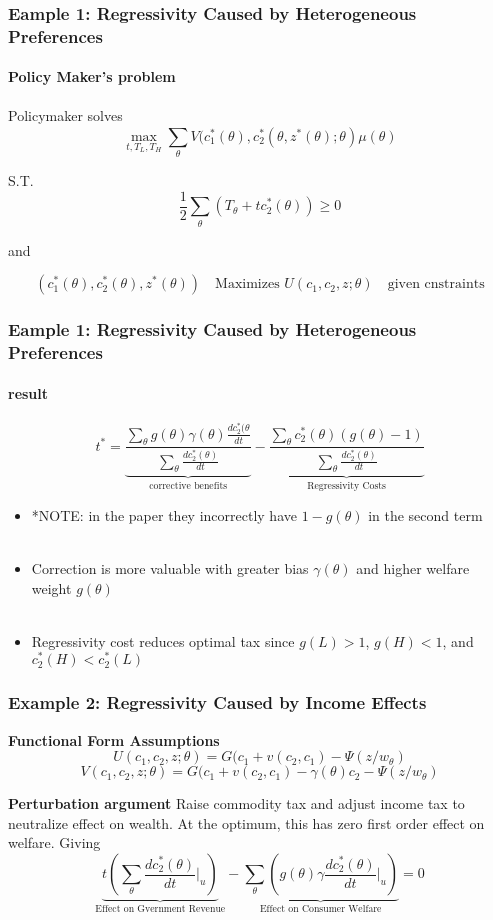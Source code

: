 \documentclass{beamer}
\begin{document}
	
	
	
\begin{frame}
\frametitle{Eample 1: Regressivity Caused by Heterogeneous Preferences }
\framesubtitle{Policy Maker's problem}

Policymaker solves 
$$\max\limits_{t, T_L, T_H} \sum_{\theta}^{} V(c_1^*(\theta), c_2^*(\theta, z^*(\theta);\theta)\mu(\theta)  $$

S.T. 
$$ \frac{1}{2} \sum_{\theta}^{}(T_{\theta} + tc_2^*(\theta)) \geq 0 $$

and 

$$ (c_1^*(\theta), c_2^*(\theta), z^*(\theta)) \quad \text{Maximizes } U(c_1,c_2,z;\theta) \quad \text{given cnstraints}$$

\end{frame}

\begin{frame}
\frametitle{Eample 1: Regressivity Caused by Heterogeneous Preferences }
\framesubtitle{result}
$$
t^* = \underbrace{ \frac{\sum_{\theta}^{} g(\theta)\gamma(\theta)\frac{dc_2^*(\theta}{dt}}{\sum_{\theta}\frac{dc_2^*(\theta)}{dt}}}_{ \text{corrective benefits}}
-
\underbrace{\frac{\sum_{\theta}c_2^*(\theta)(g(\theta) -1)}{\sum_{\theta}\frac{dc_2^*(\theta)}{dt}}}_{\text{Regressivity Costs}}
$$

\begin{itemize}


	\item  *NOTE: in the paper they incorrectly have $1-g(\theta)$ in the second term \\~\\

	\item  Correction is more valuable with greater bias $\gamma(\theta)$ and higher welfare weight $g(\theta)$ \\~\\ 

	\item  Regressivity cost reduces optimal tax since $g(L) >1$, $g(H) < 1 $, and $c_2^*(H) < c_2^*(L)$ 

\end{itemize}


\end{frame}




\begin{frame}
\frametitle{Example 2: Regressivity Caused by Income Effects }

\textbf{Functional Form Assumptions}
$$ U(c_1, c_2,z;\theta) = G(c_1 + v(c_2, c_1) - \Psi(z/w_{\theta}) $$
$$ V(c_1, c_2,z;\theta) = G(c_1 + v(c_2, c_1) - \gamma(\theta)c_2 - \Psi(z/w_{\theta})
$$

\textbf{Perturbation argument}
Raise commodity tax and adjust income tax to neutralize effect on wealth. At the optimum, this has zero first order effect on welfare. Giving 
$$ \underbrace{ t\left( \sum_{\theta} \frac{dc_2^*(\theta)}{dt} \biggr\rvert_{u} \right)}_{ \text{Effect on Gvernment Revenue}} - 
\underbrace{ \sum_{\theta} \left( g(\theta) \gamma \frac{dc_2^*(\theta)}{dt} \biggr\rvert_{u} \right)}_{ \text{Effect on Consumer Welfare}} =0
$$ 


\end{frame}
\end{document}
